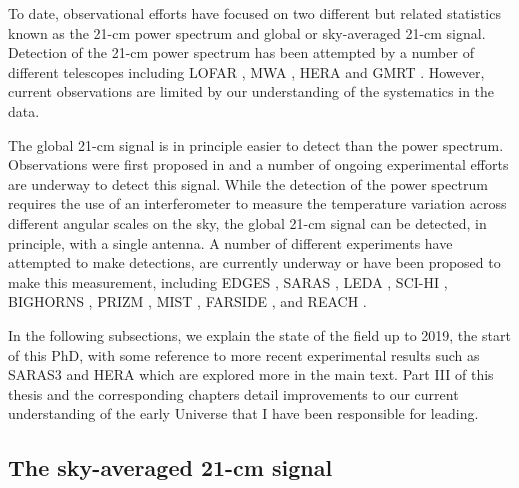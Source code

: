 To date, observational efforts have focused on two different but related statistics known as the 21-cm power spectrum and global or sky-averaged 21-cm signal. Detection of the 21-cm power spectrum has been attempted by a number of different telescopes including LOFAR \citep[LOw-Frequency ARray,][]{LOFAR_current_EoR_2018, Gehlot_lofar_2019, Ghara_LOFAR_2020, Mondal_LOFAR_2020, Greig_LOFAR_2021}, MWA \citep[Murchison Widefield Array,][]{Trott_mwa_2020, Greig_MWA_2020, Ghara_MWA_2021}, HERA \cite{HERA_2017, HERA_2022b} and GMRT \citep[Giant Metrewave Radio Telescope,][]{GMRT2011}. However, current observations are limited by our understanding of the systematics in the data.

The global 21-cm signal is in principle easier to detect than the power spectrum. Observations were first proposed in \cite{Shaver1999} and a number of ongoing experimental efforts are underway to detect this signal. While the detection of the power spectrum requires the use of an interferometer to measure the temperature variation across different angular scales on the sky, the global 21-cm signal can be detected, in principle, with a single antenna. A number of different experiments have attempted to make detections, are currently underway or have been proposed to make this measurement, including EDGES \cite{Bowman_edges_2018, EDGES_high_band_experimental_paper_2017}, SARAS \cite{SARAS2_radiometer_2018, SARAS_reciever_2021, SARAS3_antenna_2021, SARAS3_spectrometer_2020}, LEDA \cite{Price_LEDA_2018}, SCI-HI \citep[Sonda Cosmol\'{o}gica de las Islas para la Detecci\'{o}n de Hidr\'{o}geno Neutro,][]{SCIHI}, BIGHORNS \citep[Broadband Instrument for Global HydrOgen ReioNisation Signal,][]{BIGHORNS}, PRIZM \cite{Philip_PRIZM_2019}, MIST \citep[Mapper of the IGM Spin Temperature,][]{MIST}, FARSIDE \citep[Farside Array for Radio Science Investigations of the Dark ages and Exoplanets,][]{Burns_Moon_2021}, and REACH \cite{Acedo_REACH_2019, Anstey_REACH_2021,Cumner_antenna_2021, Anstey_antenna_2022, de_lera_acedo_reach_2022}.

In the following subsections, we explain the state of the field up to 2019, the start of this PhD, with some reference to more recent experimental results such as SARAS3 and HERA which are explored more in the main text. Part III of this thesis and the corresponding chapters detail improvements to our current understanding of the early Universe that I have been responsible for leading.

\subsection{The sky-averaged 21-cm signal}

